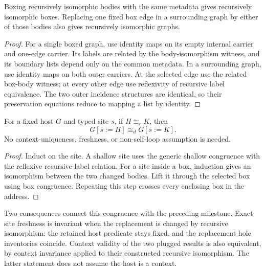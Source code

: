 \begin{lemma}
Boxing recursively isomorphic bodies with the same metadata gives recursively
isomorphic boxes. Replacing one fixed box edge in a surrounding graph by either
of those bodies also gives recursively isomorphic graphs.
\end{lemma}
\begin{proof}
For a single boxed graph, use identity maps on its empty internal carrier and
one-edge carrier. Its labels are related by the body-isomorphism witness, and
its boundary lists depend only on the common metadata. In a surrounding graph,
use identity maps on both outer carriers. At the selected edge use the related
box-body witness; at every other edge use reflexivity of recursive label
equivalence. The two outer incidence structures are identical, so their
preservation equations reduce to mapping a list by identity.
\end{proof}

\begin{theorem}
For a fixed host $G$ and typed site $s$, if $H\cong_r K$, then
\[
 G[s:=H]\cong_d G[s:=K].
\]
No context-uniqueness, freshness, or non-self-loop assumption is needed.
\end{theorem}
\begin{proof}
Induct on the site. A shallow site uses the generic shallow congruence with the
reflexive recursive-label relation. For a site inside a box, induction gives an
isomorphism between the two changed bodies. Lift it through the selected box
using box congruence. Repeating this step crosses every enclosing box in the
address.
\end{proof}

Two consequences connect this congruence with the preceding milestone. Exact
site freshness is invariant when the replacement is changed by recursive
isomorphism: the retained host predicate stays fixed, and the replacement hole
inventories coincide. Context validity of the two plugged results is also
equivalent, by context invariance applied to their constructed recursive
isomorphism. The latter statement does not assume the host is a context.

